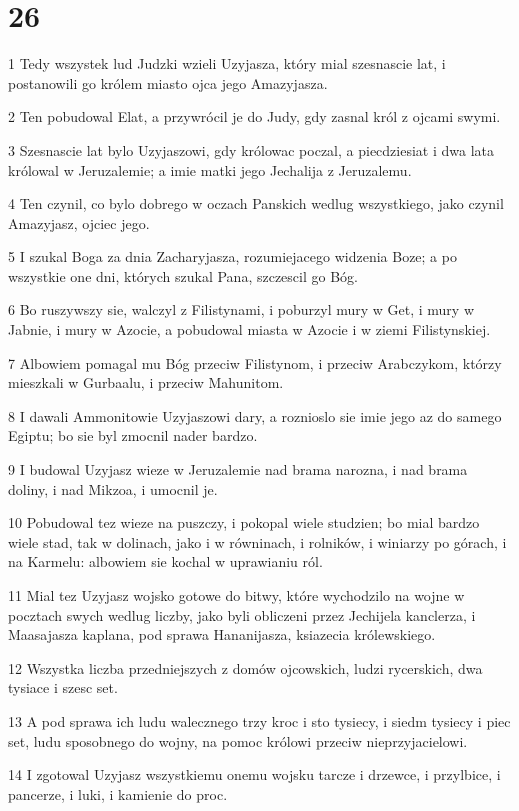 \chapter{26}

\par 1 Tedy wszystek lud Judzki wzieli Uzyjasza, który mial szesnascie lat, i postanowili go królem miasto ojca jego Amazyjasza.
\par 2 Ten pobudowal Elat, a przywrócil je do Judy, gdy zasnal król z ojcami swymi.
\par 3 Szesnascie lat bylo Uzyjaszowi, gdy królowac poczal, a piecdziesiat i dwa lata królowal w Jeruzalemie; a imie matki jego Jechalija z Jeruzalemu.
\par 4 Ten czynil, co bylo dobrego w oczach Panskich wedlug wszystkiego, jako czynil Amazyjasz, ojciec jego.
\par 5 I szukal Boga za dnia Zacharyjasza, rozumiejacego widzenia Boze; a po wszystkie one dni, których szukal Pana, szczescil go Bóg.
\par 6 Bo ruszywszy sie, walczyl z Filistynami, i poburzyl mury w Get, i mury w Jabnie, i mury w Azocie, a pobudowal miasta w Azocie i w ziemi Filistynskiej.
\par 7 Albowiem pomagal mu Bóg przeciw Filistynom, i przeciw Arabczykom, którzy mieszkali w Gurbaalu, i przeciw Mahunitom.
\par 8 I dawali Ammonitowie Uzyjaszowi dary, a roznioslo sie imie jego az do samego Egiptu; bo sie byl zmocnil nader bardzo.
\par 9 I budowal Uzyjasz wieze w Jeruzalemie nad brama narozna, i nad brama doliny, i nad Mikzoa, i umocnil je.
\par 10 Pobudowal tez wieze na puszczy, i pokopal wiele studzien; bo mial bardzo wiele stad, tak w dolinach, jako i w równinach, i rolników, i winiarzy po górach, i na Karmelu: albowiem sie kochal w uprawianiu ról.
\par 11 Mial tez Uzyjasz wojsko gotowe do bitwy, które wychodzilo na wojne w pocztach swych wedlug liczby, jako byli obliczeni przez Jechijela kanclerza, i Maasajasza kaplana, pod sprawa Hananijasza, ksiazecia królewskiego.
\par 12 Wszystka liczba przedniejszych z domów ojcowskich, ludzi rycerskich, dwa tysiace i szesc set.
\par 13 A pod sprawa ich ludu walecznego trzy kroc i sto tysiecy, i siedm tysiecy i piec set, ludu sposobnego do wojny, na pomoc królowi przeciw nieprzyjacielowi.
\par 14 I zgotowal Uzyjasz wszystkiemu onemu wojsku tarcze i drzewce, i przylbice, i pancerze, i luki, i kamienie do proc.
